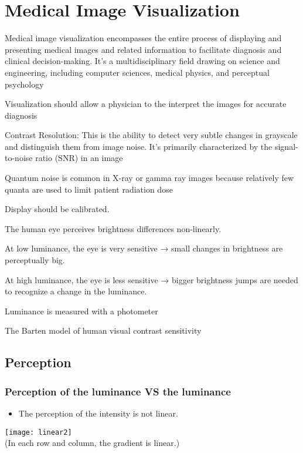 \part{Medical Image Visualization}

Medical image visualization encompasses the entire process of displaying and presenting medical images and related information to facilitate diagnosis and clinical decision-making. It's a multidisciplinary field drawing on science and engineering, including computer sciences, medical physics, and perceptual psychology

Visualization should allow a physician to the interpret the images for accurate diagnosis

Contrast Resolution: This is the ability to detect very subtle changes in grayscale and distinguish them from image noise. It's primarily characterized by the signal-to-noise ratio (SNR) in an image

Quantum noise is common in X-ray or gamma ray images because relatively few quanta are used to limit patient radiation dose

Display should be calibrated.

The human eye perceives brightness differences non-linearly.

At low luminance, the eye is very sensitive → small changes in brightness are perceptually big.

At high luminance, the eye is less sensitive → bigger brightness jumps are needed to recognize a change in the luminance.

Luminance is measured with a photometer

The Barten model of human visual contrast sensitivity


\chapter{Perception}

\section{Perception of the luminance VS the luminance}
\begin{itemize}
\item The perception of the intensity is not linear.
\end{itemize}
\begin{center}
  \texttt{[image: linear2]}\\
  (In each row and column, the gradient is linear.)
\end{center}

